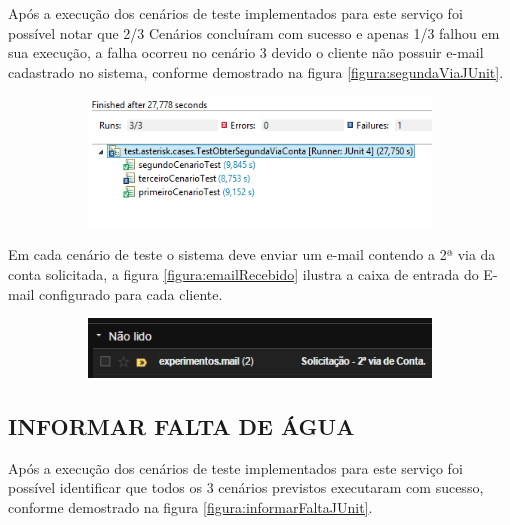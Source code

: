  Após a execução dos cenários de teste implementados para este serviço foi possível notar que 2/3 Cenários concluíram com sucesso e apenas 1/3 falhou em sua execução, a falha ocorreu no cenário 3 devido o cliente não possuir e-mail cadastrado no sistema, conforme demostrado na figura \ref{figura:segundaViaJUnit}.	
 \begin{figure}[H]
 	\centering
		\caption{Obter 2ª Via de Conta - Detalhes execução dos testes}
		\label{figura:segundaViaJUnit}
 	\begin{subfigure}[H]{\textwidth}
 		\centering
 		\includegraphics{figuras/cenarios/segunda_via/junit_result.PNG}
 	\end{subfigure}
 \end{figure}	
	

Em cada cenário de teste o sistema deve enviar um e-mail contendo a 2ª via da conta solicitada, a figura \ref{figura:emailRecebido} ilustra a caixa de entrada do E-mail configurado para cada cliente.
\begin{figure}[H]
	\centering
	\caption{Obter 2ª Via de Conta - E-mail recebido pelo cliente}
	\label{figura:emailRecebido}
	\begin{subfigure}[H]{\textwidth}
		\centering
		\includegraphics{figuras/cenarios/segunda_via/envio_email.PNG}
	\end{subfigure}
\end{figure}

	
\subsection{\textbf{\uppercase{Informar Falta de Água}}}

 Após a execução dos cenários de teste implementados para este serviço foi possível identificar que todos os 3 cenários previstos executaram com sucesso, conforme demostrado na figura \ref{figura:informarFaltaJUnit}.	

